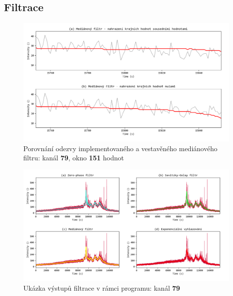 \documentclass[a4paper, 12pt]{article}
\begin{document}
\subsection{Filtrace}
\begin{figure}[hbt!]
 \centering
 \includegraphics[width=\linewidth,height=0.65\linewidth]{median_diskuse.png}
 \caption{Porovnání odezvy implementovaného a vestavěného mediánového filtru: kanál \textbf{79}, okno \textbf{151} hodnot}
 \label{fig:median_srovnani}
\end{figure}

\vskip 0.2in

\begin{figure}[hbt!]
 \centering
 \includegraphics[width=\linewidth,height=0.65\linewidth]{exp_figures.png}
 \caption{Ukázka výstupů filtrace v rámci programu: kanál \textbf{79}}
 \label{fig:exp_filtry}
\end{figure}
\end{document}
